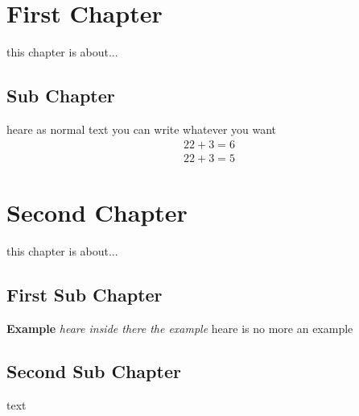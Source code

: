 \documentclass{article}%
\begin{document}
%
\normalsize%
\section{ First Chapter }%
\label{sec:FirstChapter}%
this chapter is about...\newline%
%
\subsection{ Sub Chapter }%
\label{subsec:SubChapter}%
heare as normal text you can write whatever you want\newline%
%
\begin{alignat}{2}%
2+3=6
%
\end{alignat}%
\begin{alignat}{2}%
2+3=5
%
\end{alignat}%
\newline%

%
\section{ Second Chapter }%
\label{sec:SecondChapter}%
this chapter is about...\newline%
%
\subsection{ First Sub Chapter }%
\label{subsec:FirstSubChapter}%
\textbf{ Example \newline%
}%
\textit{heare inside there the example\newline%
}%
heare is no more an example\newline%
%
\newline%

%
\subsection{ Second Sub Chapter }%
\label{subsec:SecondSubChapter}%
text

%
\end{document}

